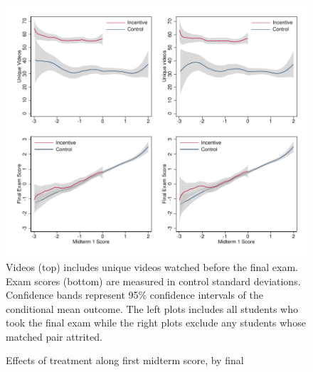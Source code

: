 \documentclass[12pt]{article}
\begin{document}
\clearpage
\begin{figure}[t]
\begin{center}
\caption{Effects of treatment along first midterm score, by final}
\label{locallin_final}
\includegraphics[width=1\textwidth, angle=0]{../plots/lpolyfinal}
\footnotesize Videos (top) includes unique videos watched before the final exam.
Exam scores (bottom) are measured in control standard deviations.
Confidence bands represent 95\% confidence intervals of the conditional mean outcome.
The left plots includes all students who took the final exam while the right plots exclude any students whose matched pair attrited.
\end{center}
\end{figure}

\end{document}
